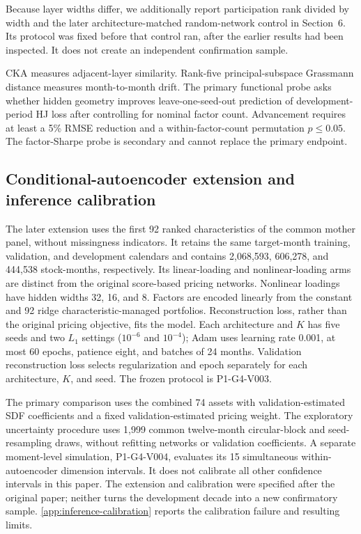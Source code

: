 Because layer widths differ, we additionally report participation rank divided by width and the later architecture-matched random-network control in Section~6. Its protocol was fixed before that control ran, after the earlier results had been inspected. It does not create an independent confirmation sample.

CKA measures adjacent-layer similarity. Rank-five principal-subspace Grassmann distance measures month-to-month drift. The primary functional probe asks whether hidden geometry improves leave-one-seed-out prediction of development-period HJ loss after controlling for nominal factor count. Advancement requires at least a 5\% RMSE reduction and a within-factor-count permutation $p\leq0.05$. The factor-Sharpe probe is secondary and cannot replace the primary endpoint.

\subsection{Conditional-autoencoder extension and inference calibration}

The later extension uses the first 92 ranked characteristics of the common mother panel, without missingness indicators. It retains the same target-month training, validation, and development calendars and contains 2,068,593, 606,278, and 444,538 stock-months, respectively. Its linear-loading and nonlinear-loading arms are distinct from the original score-based pricing networks. Nonlinear loadings have hidden widths 32, 16, and 8. Factors are encoded linearly from the constant and 92 ridge characteristic-managed portfolios. Reconstruction loss, rather than the original pricing objective, fits the model. Each architecture and $K$ has five seeds and two $L_1$ settings ($10^{-6}$ and $10^{-4}$); Adam uses learning rate 0.001, at most 60 epochs, patience eight, and batches of 24 months. Validation reconstruction loss selects regularization and epoch separately for each architecture, $K$, and seed. The frozen protocol is P1-G4-V003.

The primary comparison uses the combined 74 assets with validation-estimated SDF coefficients and a fixed validation-estimated pricing weight. The exploratory uncertainty procedure uses 1,999 common twelve-month circular-block and seed-resampling draws, without refitting networks or validation coefficients. A separate moment-level simulation, P1-G4-V004, evaluates its 15 simultaneous within-autoencoder dimension intervals. It does not calibrate all other confidence intervals in this paper. The extension and calibration were specified after the original paper; neither turns the development decade into a new confirmatory sample. \ref{app:inference-calibration} reports the calibration failure and resulting limits.

